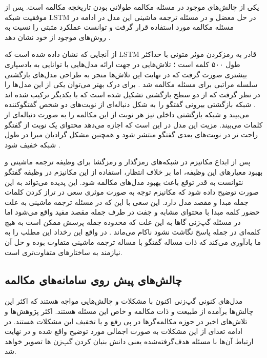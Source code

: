 یکی از چالش‌های موجود در مسئله مکالمه طولانی بودن تاریخچه مکالمه است. پس از موفقیت شبکه LSTM در حل معضل 
و 
در مسئله ترجمه ماشینی این مدل در ادامه در مسئله مکالمه مورد استفاده قرار گرفت و توانست عملکرد مثبتی را نسبت به روش‌های موجود از خود نشان دهد
\cite{A_Neural_Conversational_Model}.

از آنجایی که نشان داده شده است که LSTM قادر به رمزکردن موثر متونی با حداکثر طول ۵۰۰ کلمه است
\cite{DBLP:journals/corr/abs-1805-04623}
؛
تلاش‌هایی در جهت ارائه مدل‌هایی با توانایی به یادسپاری بیشتری صورت گرفت که در نهایت این تلاش‌ها منجر به طراحی مدل‌های بازگشتی سلسله مراتبی برای مسئله مکالمه شد
\cite{DBLP:journals/corr/SerbanSBCP15, DBLP:journals/corr/XingWWZHM17, DBLP:journals/corr/SordoniBVLSN15}.
برای درک بهتر می‌توان یکی از این مدل‌ها را در نظر گرفت که از دو سطح بازگشتی تشکیل شده است که با یکدیگر ترکیب شده اند
\cite{DBLP:journals/corr/SordoniBVLSN15}.
شبکه بازگشتی بیرونی گفتگو را به شکل دنباله‌ای از نوبت‌های دو شخص گفتگوکننده می‌بیند و شبکه بازگشتی داخلی نیز هر نوبت از این مکالمه را به صورت دنباله‌ای از کلمات می‌بیند. مزیت این مدل در این است که اجازه می‌دهد محتوای یک نوبت از گفتگو راحت تر در نوبت‌های بعدی گفتگو منتشر شود و همچنین مشکل گرادیان میرا در طول شبکه خفیف شود
\cite{Gao_Neural_Approaches}.

پس از ابداع مکانیزم
در شبکه‌های رمزگذار و رمزگشا برای وظیفه ترجمه ماشینی و بهبود معیار‌های این وظیفه، اما بر خلاف انتظار، استفاده از این مکانیزم در وظیفه گفتگو نتوانست به قدر توقع باعث بهبود مدل‌های مکالمه شود. این پدیده می‌تواند به این صورت توضیح داده‌ شود که مکانیزم توجه به صورت موثری سعی در تراز کردن کلمات جمله مبدا و مقصد مدل دارد. این سعی با این که در مسئله ترجمه ماشینی به علت حضور کلمه مبدا با محتوای مشابه و جفت در طرف جمله مقصد مفید واقع می‌شود اما در مسئله گپ‌زنی گاها به این علت که محدوده جمله پرسش ممکن است به هیچ کلمه‌ای در جمله پاسخ نگاشت نشود ناکام می‌ماند
\cite{Gao_Neural_Approaches}.
در واقع این رخداد این مطلب را به ما یادآوری می‌کند که ذات مساله گفتگو با مساله ترجمه ماشینی متفاوت بوده و حل آن نیازمند به ساختارهای متفاوت‌تری است.

\subsection{چالش‌های پیش روی سامانه‌های مکالمه}
مدل‌های کنونی گپ‌زنی اکنون با مشکلات و چالش‌هایی مواجه هستند که اکثر این چالش‌ها برآمده از طبیعت و ذات مکالمه و خاص این مسئله هستند. اکثر پژوهش‌ها و تلاش‌های اخیر در حوزه مکالمه‌گرها در پی رفع و یا تخفیف این مشکلات هستند. در ادامه تعدای از این مشکلات 
به صورت اجمالی مورد توضیح واقع شده و در نهایت ارتباط آن‌ها با مسئله هدف‌گرفته‌شده یعنی دانش بنیان کردن گپ‌زن ها تصویر خواهد شد.

